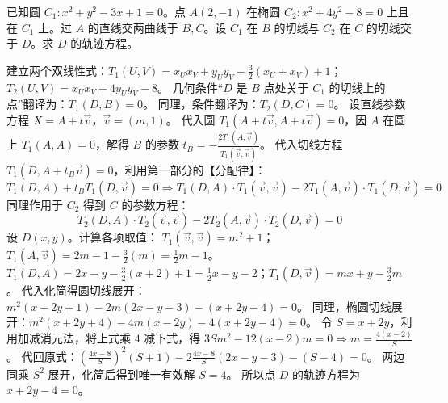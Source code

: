 \begin{exercise}
已知圆 $C_1: x^2+y^2-3x+1=0$。点 $A(2,-1)$ 在椭圆 $C_2: x^2+4y^2-8=0$ 上且在 $C_1$ 上。过 $A$ 的直线交两曲线于 $B,C$。设 $C_1$ 在 $B$ 的切线与 $C_2$ 在 $C$ 的切线交于 $D$。求 $D$ 的轨迹方程。
\end{exercise}
\begin{solution}
建立两个双线性式：$T_1(U,V) = x_U x_V + y_U y_V - \frac{3}{2}(x_U+x_V) + 1$；$T_2(U,V) = x_U x_V + 4y_U y_V - 8$。
几何条件“$D$ 是 $B$ 点处关于 $C_1$ 的切线上的点”翻译为：$T_1(D, B) = 0$。
同理，条件翻译为：$T_2(D, C) = 0$。
设直线参数方程 $X = A + t\vec{v}$，$\vec{v}=(m,1)$。
代入圆 $T_1(A+t\vec{v}, A+t\vec{v}) = 0$，因 $A$ 在圆上 $T_1(A,A)=0$，解得 $B$ 的参数 $t_B = -\frac{2T_1(A,\vec{v})}{T_1(\vec{v},\vec{v})}$。
代入切线方程 $T_1(D, A + t_B\vec{v}) = 0$，利用第一部分的【分配律】：
$$ T_1(D, A) + t_B T_1(D, \vec{v}) = 0 \Rightarrow T_1(D, A) \cdot T_1(\vec{v}, \vec{v}) - 2T_1(A, \vec{v}) \cdot T_1(D, \vec{v}) = 0 $$
同理作用于 $C_2$ 得到 $C$ 的参数方程：
$$ T_2(D, A) \cdot T_2(\vec{v}, \vec{v}) - 2T_2(A, \vec{v}) \cdot T_2(D, \vec{v}) = 0 $$
设 $D(x,y)$。计算各项取值：
$T_1(\vec{v},\vec{v}) = m^2+1$；$T_1(A,\vec{v}) = 2m-1-\frac{3}{2}(m) = \frac{1}{2}m-1$。
$T_1(D,A) = 2x-y-\frac{3}{2}(x+2)+1 = \frac{1}{2}x-y-2$；$T_1(D,\vec{v}) = mx+y-\frac{3}{2}m$。
代入化简得圆切线展开：$m^2(x+2y+1) - 2m(2x-y-3) - (x+2y-4) = 0$。
同理，椭圆切线展开：$m^2(x+2y+4) - 4m(x-2y) - 4(x+2y-4) = 0$。
令 $S = x+2y$，利用加减消元法，将上式乘 $4$ 减下式，得 $3S m^2 - 12(x-2)m = 0 \Rightarrow m = \frac{4(x-2)}{S}$。
代回原式：$(\frac{4x-8}{S})^2(S+1) - 2\frac{4x-8}{S}(2x-y-3) - (S-4) = 0$。
两边同乘 $S^2$ 展开，化简后得到唯一有效解 $S = 4$。
所以点 $D$ 的轨迹方程为 $x + 2y - 4 = 0$。
\end{solution}

